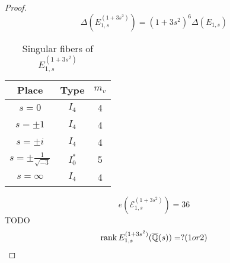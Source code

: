 \documentclass[main]{subfiles}
\begin{document}
\begin{proof}
    \begin{equation}
        \Delta(E_{1,s}^{(1 + 3s^{2})}) = (1 + 3s^{2})^{6} \Delta(E_{1,s})
    \end{equation}
    \begin{table}[h]
        \centering
        \caption{Singular fibers of $E_{1,s}^{(1 + 3s^{2})}$}
        \begin{tabular}{|c|c|c|}
            \hline
            Place                        & Type    & $m_v$ \\
            \hline
            $s=0$                        & $I_4$   & 4     \\
            $s=\pm 1$                    & $I_4$   & 4     \\
            $s=\pm i$                    & $I_4$   & 4     \\
            $s=\pm \frac{1}{\sqrt{-3}} $ & $I_0^*$ & 5     \\
            $s=\infty$                   & $I_4$   & 4     \\
            \hline
        \end{tabular}
    \end{table}
    \begin{equation}
        e(\mathcal{E}_{1,s}^{(1 + 3s^{2})}) = 36
    \end{equation}
    TODO
    \begin{equation}
        \operatorname{rank} E_{1,s}^{(1 + 3s^{2})}(\overline{\mathbb{Q}}(s)) = ? (1 or 2)
    \end{equation}
\end{proof}
\end{document}
